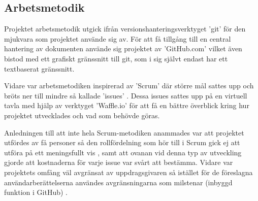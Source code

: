 
    \newpage

    \subsection{Arbetsmetodik} %
    \label{sub:arbetsmetodik}
        Projektet arbetsmetodik utgick ifrån versionshanteringsverktyget 'git' 
        för den mjukvara som projektet använde sig av. För att få tillgång 
        till en central hantering av dokumenten använde sig projektet av 'GitHub.com' vilket även bistod med ett grafiskt gränssnitt till git, som i sig självt endast har ett textbaserat gränssnitt. \bigskip

        Vidare var arbetsmetodiken inspirerad av 'Scrum' där större mål sattes upp och bröts ner till mindre så kallade 'issues' \cite[kap.~8]{scrum}. Dessa issues sattes upp på en virtuell tavla med hjälp av verktyget 'Waffle.io' för att få en bättre överblick kring hur projektet utvecklades och vad som behövde göras. \bigskip

        Anledningen till att inte hela Scrum-metodiken anammades var att projektet utfördes av få personer så den rollfördelning som hör till i Scrum gick ej att utföra på ett meningsfullt vis \cite[kap.~6]{scrum}, samt att ovanan vid denna typ av utveckling gjorde att kostnaderna för varje issue var svårt att bestämma. Vidare var projektets omfång väl avgränsat av uppdrags\-givaren så istället för de föreslagna användarberättelserna användes avgränsningarna som milstenar (inbyggd funktion i GitHub) \cite[kap.~9]{scrum}.

